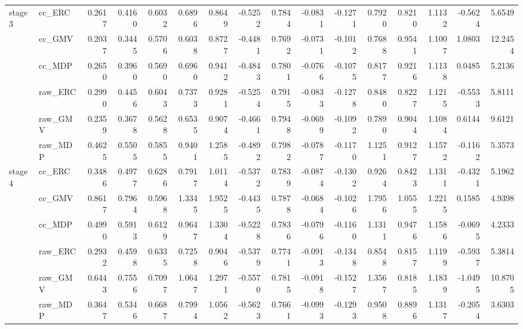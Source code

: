 \begin{tabular}{llrrrrrrrrrrrrrr}
\cline{1-16}
\multirow[t]{6}{*}{stage3} & cc_ERC & 0.2617 & 0.4160 & 0.6032 & 0.6896 & 0.8649 & -0.5252 & 0.7844 & -0.0831 & -0.1271 & 0.7920 & 0.8210 & 1.1132 & -0.5624 & 5.6549 \\
 & cc_GMV & 0.2037 & 0.3445 & 0.5706 & 0.6038 & 0.8727 & -0.4481 & 0.7692 & -0.0731 & -0.1012 & 0.7688 & 0.9541 & 1.1007 & 1.0803 & 12.2454 \\
 & cc_MDP & 0.2650 & 0.3960 & 0.5690 & 0.6960 & 0.9412 & -0.4843 & 0.7801 & -0.0766 & -0.1075 & 0.8177 & 0.9216 & 1.1138 & 0.0485 & 5.2136 \\
 & raw_ERC & 0.2990 & 0.4456 & 0.6043 & 0.7373 & 0.9281 & -0.5254 & 0.7915 & -0.0833 & -0.1278 & 0.8480 & 0.8227 & 1.1215 & -0.5533 & 5.8111 \\
 & raw_GMV & 0.2359 & 0.3678 & 0.5628 & 0.6535 & 0.9074 & -0.4661 & 0.7948 & -0.0699 & -0.1092 & 0.7890 & 0.9044 & 1.1084 & 0.6144 & 9.6121 \\
 & raw_MDP & 0.4625 & 0.5505 & 0.5855 & 0.9401 & 1.2585 & -0.4892 & 0.7982 & -0.0787 & -0.1170 & 1.1251 & 0.9127 & 1.1572 & -0.1162 & 5.3573 \\
\cline{1-16}
\multirow[t]{6}{*}{stage4} & cc_ERC & 0.3486 & 0.4977 & 0.6286 & 0.7917 & 1.0114 & -0.5372 & 0.7839 & -0.0874 & -0.1302 & 0.9264 & 0.8423 & 1.1311 & -0.4321 & 5.1962 \\
 & cc_GMV & 0.8617 & 0.7964 & 0.5968 & 1.3345 & 1.9525 & -0.4435 & 0.7878 & -0.0684 & -0.1026 & 1.7956 & 1.0555 & 1.2215 & 0.1585 & 4.9398 \\
 & cc_MDP & 0.4990 & 0.5913 & 0.6129 & 0.9647 & 1.3304 & -0.5228 & 0.7836 & -0.0796 & -0.1160 & 1.1311 & 0.9476 & 1.1586 & -0.0695 & 4.2333 \\
 & raw_ERC & 0.2932 & 0.4598 & 0.6335 & 0.7258 & 0.9046 & -0.5379 & 0.7741 & -0.0913 & -0.1348 & 0.8548 & 0.8157 & 1.1199 & -0.5937 & 5.3814 \\
 & raw_GMV & 0.6443 & 0.7556 & 0.7097 & 1.0647 & 1.2971 & -0.5570 & 0.7815 & -0.0918 & -0.1527 & 1.3567 & 0.8185 & 1.1839 & -1.0495 & 10.8705 \\
 & raw_MDP & 0.3647 & 0.5346 & 0.6687 & 0.7994 & 1.0562 & -0.5623 & 0.7661 & -0.0993 & -0.1293 & 0.9508 & 0.8896 & 1.1317 & -0.2054 & 3.6303 \\
\cline{1-16}
\bottomrule
\end{tabular}
